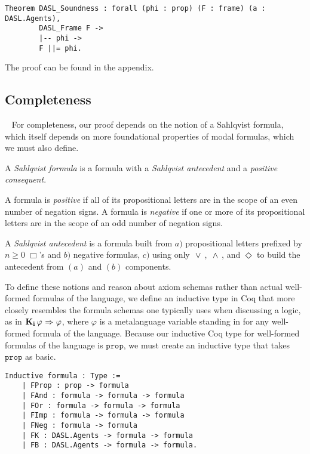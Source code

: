 \begin{tcolorbox}
	\begin{lstlisting}[language=Coq]
	Theorem DASL_Soundness : forall (phi : prop) (F : frame) (a : DASL.Agents),
		DASL_Frame F ->
		|-- phi ->
		F ||= phi.
	\end{lstlisting}	
	
\end{tcolorbox}

	
The proof can be found in the appendix.

\subsection{Completeness}~\label{sec:completeness}
For completeness, our proof depends on the notion of a Sahlqvist formula, which itself depends on more foundational properties of modal formulas, which we must also define. 

A \emph{Sahlqvist formula} is a formula with a \emph{Sahlqvist antecedent} and a \emph{positive consequent}.

A formula is \emph{positive} if all of its propositional letters are in the scope of an even number of negation signs. A formula is \emph{negative} if one or more of its propositional letters are in the scope of an odd number of negation signs.

A \emph{Sahlqvist antecedent} is a formula built from $a)$ propositional letters prefixed by $n\geq0$ $\Box$'s and $b)$ negative formulas, $c)$ using only ${\ \vee \ }$, ${\ \wedge \ }$, and $\Diamond$ to build the antecedent from $(a)$ and $(b)$ components.

To define these notions and reason about axiom schemas rather than actual well-formed formulas of the language, we define an inductive type in Coq that more closely resembles the formula schemas one typically uses when discussing a logic, as in $\mathbf{K}_{\mathbf{i}}\,\varphi {\ \Rightarrow \ } \varphi$, where $\varphi$ is a metalanguage variable standing in for any well-formed formula of the language. Because our inductive Coq type for well-formed formulas of the language is $\mathtt{prop}$, we must create an inductive type that takes $\mathtt{prop}$ as basic.

\begin{tcolorbox}
	\begin{lstlisting}[language=Coq]
 Inductive formula : Type :=
	| FProp : prop -> formula
	| FAnd : formula -> formula -> formula
	| FOr : formula -> formula -> formula
	| FImp : formula -> formula -> formula
	| FNeg : formula -> formula
	| FK : DASL.Agents -> formula -> formula
	| FB : DASL.Agents -> formula -> formula.
	\end{lstlisting}	
	
\end{tcolorbox}

